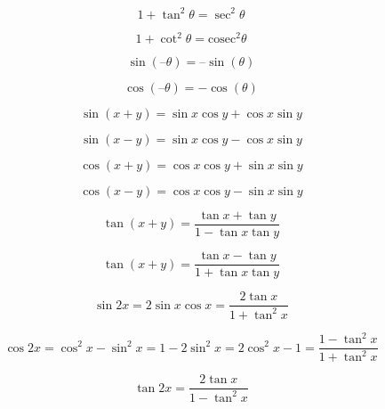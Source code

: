 \begin{equation}
1+\tan^2\theta=\sec^2\theta
\end{equation}

\begin{equation}
1+\cot^2\theta=\mathrm{cosec }^2\theta
\end{equation}


\begin{equation}
\sin(–\theta) = – \sin(\theta)
\end{equation}

\begin{equation}
\cos(–\theta) = -\cos(\theta)
\end{equation}

\begin{equation}
\sin(x+y)=\sin x \cos y + \cos x \sin y
\end{equation}

\begin{equation}
\sin(x-y)=\sin x \cos y - \cos x \sin y
\end{equation}


\begin{equation}
\cos(x+y)=\cos x \cos y + \sin x \sin y
\end{equation}

\begin{equation}
\cos(x-y)=\cos x \cos y - \sin x \sin y
\end{equation}




\begin{equation}
\tan(x+y)=\frac{
\tan x + \tan y
}{
1- \tan x \tan y
}
\end{equation}



\begin{equation}
\tan(x+y)=\frac{
\tan x - \tan y
}{
1 + \tan x \tan y
}
\end{equation}


\begin{equation}
\sin 2x = 2 \sin x \cos x = \frac{
2\tan x
}{
1+\tan^2x
}
\end{equation}


\begin{equation}
\cos 2x =  \cos^2 x - \sin^2 x = 
1-2\sin^2x=
2\cos^2x-1=
\frac{
1-\tan^2 x
}{
1+\tan^2x
}
\end{equation}


\begin{equation}
\tan 2x=\frac{
2\tan x
}{
1-\tan^2x
}
\end{equation}



